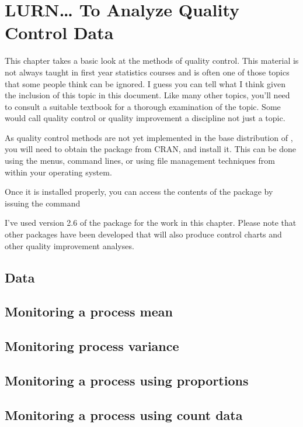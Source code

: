 

\chapter{LURN\ldots{} To Analyze Quality Control Data} 
\label{QualityControl} 
 

 
This chapter takes a basic look at the methods of quality control. This material is not always taught in first year statistics courses and is often one of those topics that some people think can be ignored. I guess you can tell what I think given the inclusion of this topic in this document. Like many other topics, you'll need to consult a suitable textbook for a thorough examination of the topic. Some would call quality control or quality improvement a discipline not just a topic. 
 
As quality control methods are not yet implemented in the base distribution of \R{}, you will need to obtain the  package from CRAN, and install it. This can be done using the menus, command lines, or using file management techniques from within your operating system. 
 
Once it is installed properly, you can access the contents of the package by issuing the command 
\begin{knitrout}
\color{fgcolor}\begin{kframe}
\begin{alltt}
\hlstd{> }
\end{alltt}


{\ttfamily\noindent\itshape\color{messagecolor}{Package 'qcc', version 2.6}}

{\ttfamily\noindent\itshape{}}\end{kframe}
\end{knitrout}
 
I've used version 2.6 of the  package for the work in this chapter. Please note that other packages have been developed that will also produce control charts and other quality improvement analyses. 
 
 
\section{Data} 
 
\section{Monitoring a process mean} 
 
\section{Monitoring process variance} 
 
\section{Monitoring a process using proportions} 
 
 
\section{Monitoring a process using count data} 
 

